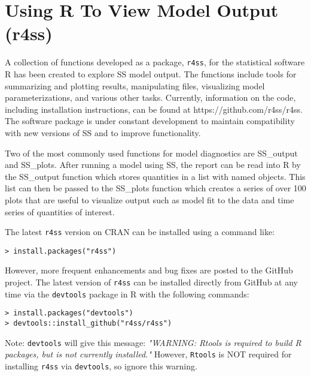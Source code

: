 \section{Using R To View Model Output (r4ss)}\label{r4ss}

A collection of functions developed as a package, \texttt{r4ss}, for the statistical software R has been created to explore SS model output.  The functions include tools for summarizing and plotting results, manipulating files, visualizing model parameterizations, and various other tasks.  Currently, information on the code, including installation instructions, can be found at https://github.com/r4ss/r4ss.  The software package is under constant development to maintain compatibility with new versions of SS and to improve functionality. 

Two of the most commonly used functions for model diagnostics are SS\_output and SS\_plots.  After running a model using SS, the report can be read into R by the SS\_output function which stores quantities in a list with named objects.  This list can then be passed to the SS\_plots function which creates a series of over 100 plots that are useful to visualize output such as model fit to the data and time series of quantities of interest. 

The latest \texttt{r4ss} version on CRAN can be installed using a command like:

\begin{verbatim}
> install.packages("r4ss")
\end{verbatim}

However, more frequent enhancements and bug fixes are posted to the GitHub project.  The latest version of \texttt{r4ss} can be installed directly from GitHub at any time via the \texttt{devtools} package in R with the following commands:

\begin{verbatim}
> install.packages("devtools")
> devtools::install_github("r4ss/r4ss")
\end{verbatim}

Note: \texttt{devtools} will give this message: \textit{"WARNING: Rtools is required to build R packages, but is not currently installed."} However, \texttt{Rtools} is NOT required for installing \texttt{r4ss} via \texttt{devtools}, so ignore this warning.  

